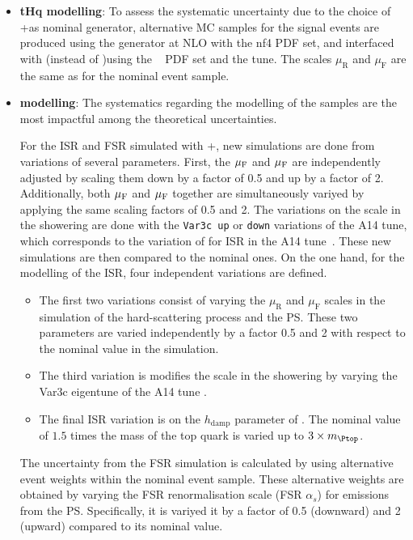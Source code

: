\begin{itemize}

	\item \textbf{tHq modelling}: To assess the systematic uncertainty due to the choice
	of \MGNLO[2.6.2.]+\PYTHIA as nominal generator, alternative MC samples for the \tHq 
	signal events are produced using the \MGNLO[2.8.1] generator at NLO with 
	the \NNPDF[3.0nlo] nf4 PDF set, and interfaced with \HERWIG[7.1.6] (instead 
	of \PYTHIA)using the \MMHT[nnlo]~\cite{Harland-Lang:2014zoa} PDF set and the 
	\HERWIG[7.1]\cite{Bahr:2008pv, Bellm:2015jjp} tune. 
	The scales $\mu_{\text{R}}$ and $\mu_{\text{F}}$ are the same as for the nominal 
	\tHq event sample.

	\item \textbf{\ttbar modelling}: The systematics regarding the modelling of the \ttbar samples 
		are the most impactful among the theoretical uncertainties.  
		
		For the ISR and FSR simulated with \POWHEG+\PYTHIA, new simulations are done from 
		variations of several parameters. First, the $\mu_{\text{F}}$ and $\mu_{\text{F}}$ are independently adjusted
		by scaling them down by a factor of 0.5 and up by a factor of 2. 
		Additionally, both $\mu_{\text{F}}$ and $\mu_{\text{F}}$ together are simultaneously variyed by applying the same scaling factors of 0.5 and 2.
		The variations on the scale in the showering are done with the \texttt{Var3c up} or 
		\texttt{down} variations of the A14 tune, which corresponds to the variation of \alphas 
		for ISR in the A14 tune~\cite{ATL-PHYS-PUB-2014-021}. 
		These new simulations are then compared to the nominal ones.
		On the one hand, for the modelling of the ISR, four independent variations are defined.
		\begin{itemize}
			\item The first two variations consist of varying the $\mu_{\text{R}}$ 
			and $\mu_{\text{F}}$ scales in the simulation of the hard-scattering process and the PS.
			These two parameters are varied independently by a factor 0.5 and 2 with 
		 	respect to the nominal value in the simulation.
			\item The third variation is modifies the scale in the showering by varying the Var3c 
			eigentune of the A14 tune \cite{ATL-PHYS-PUB-2017-007}.
			\item The final ISR variation is on the $h_{\text{damp}}$ parameter of \HERWIG.
			The nominal value of $1.5$ times the mass of the top quark is varied up to
			$3\times\mtop$.			
		\end{itemize}
		The uncertainty from the FSR simulation is calculated by using alternative event 
		weights within the nominal \ttbar event sample. These alternative weights are 
		obtained by varying the FSR renormalisation scale (FSR $\alpha_s$) for emissions from the PS. 
		Specifically, it is variyed it by a factor of 0.5 (downward) and 2 (upward) compared to its nominal value.
		

\end{itemize}

